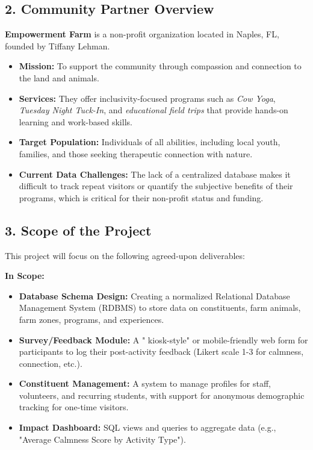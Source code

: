 \documentclass[11pt]{article}
\begin{document}
\subsection*{2. Community Partner Overview}
\textbf{Empowerment Farm} is a non-profit organization located in Naples, FL, founded by Tiffany Lehman. 
\begin{itemize}
    \item \textbf{Mission:} To support the community through compassion and connection to the land and animals.
    \item \textbf{Services:} They offer inclusivity-focused programs such as \textit{Cow Yoga}, \textit{Tuesday Night Tuck-In}, and \textit{educational field trips} that provide hands-on learning and work-based skills.
    \item \textbf{Target Population:} Individuals of all abilities, including local youth, families, and those seeking therapeutic connection with nature.
    \item \textbf{Current Data Challenges:} The lack of a centralized database makes it difficult to track repeat visitors or quantify the subjective benefits of their programs, which is critical for their non-profit status and funding.
\end{itemize}

\subsection*{3. Scope of the Project}
This project will focus on the following agreed-upon deliverables:

\textbf{In Scope:}
\begin{itemize}
    \item \textbf{Database Schema Design:} Creating a normalized Relational Database Management System (RDBMS) to store data on constituents, farm animals, farm zones, programs, and experiences.
    \item \textbf{Survey/Feedback Module:} A " kiosk-style" or mobile-friendly web form for participants to log their post-activity feedback (Likert scale 1-3 for calmness, connection, etc.).
    \item \textbf{Constituent Management:} A system to manage profiles for staff, volunteers, and recurring students, with support for anonymous demographic tracking for one-time visitors.
    \item \textbf{Impact Dashboard:} SQL views and queries to aggregate data (e.g., "Average Calmness Score by Activity Type").
\end{itemize}
\end{document}
